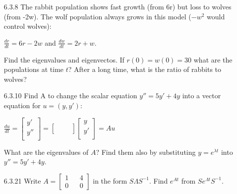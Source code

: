 \documentclass[10pt,twoside,reqno]{article}
\begin{document}
\begin{enumerate}
\vspace{3mm}
\item[6.3.8] The rabbit population shows fast growth (from 6r) but loss to wolves (from -2w). The wolf population always grows in this model ($-w^2$ would control wolves):\\
\begin{center}
$\frac{dr}{dt} = 6r - 2w$ \hspace{3mm} and \hspace{3mm} $\frac{dw}{dt} = 2r + w$.\\
\end{center}
Find the eigenvalues and eigenvectos. If $r(0) = w(0) = 30$ what are the populations at time $t$? After a long time, what is the ratio of rabbits to wolves?\\


\vspace{3mm}
\item[6.3.10] Find A to change the scalar equation $y'' = 5y' + 4y$ into a vector equation for $u = (y, y')$:\\
\begin{center}
$
$$
\frac{du}{dt} =
\begin{bmatrix}
y'\\
y''\\
\end{bmatrix}
=
\begin{bmatrix}
&&\\
&&\\
\end{bmatrix}
\begin{bmatrix}
y\\
y'\\
\end{bmatrix}
= Au
$$
$\\
\end{center}
What are the eigenvalues of $A$? Find them also by substituting $y = e^{\lambda t}$ into  $y'' = 5y' + 4y$.\\


\vspace{3mm}
\item[6.3.21] Write $A = \left[\begin{smallmatrix} 1 && 4\\ 0 && 0 \end{smallmatrix} \right]$ in the form $S\Lambda S^{-1}$. Find $e^{At}$ from $Se^{\Lambda t} S^{-1}$.\\


\vspace{3mm}
\end{enumerate}
\end{document}
